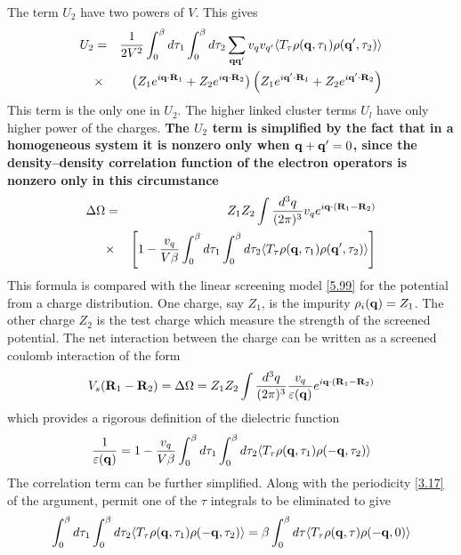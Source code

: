 The term $U_2$ have two powers of $V$. This gives
\begin{eqnarray}
    U_2 &=& \frac{1}{2V^2} \int_0^\beta d\tau_1 \int_0^\beta d \tau_2 \sum_{\mathbf{q}\mathbf{q}'} v_q v_{q'} \langle T_\tau \rho(\mathbf{q},\tau_1) \rho(\mathbf{q}',\tau_2) \rangle \nonumber \\
    &\times&\left( Z_1 e^{i\mathbf{q}\cdot\mathbf{R}_1} +Z_2 e^{i\mathbf{q}\cdot\mathbf{R}_2} \right) \left(Z_1 e^{i\mathbf{q}'\cdot\mathbf{R}_1} +Z_2 e^{i\mathbf{q}'\cdot\mathbf{R}_2} \right) \label{5.105}
\end{eqnarray}
This term is the only one in $U_2$.
The higher linked cluster terms $U_l$ have only higher power of the charges.
\textbf{The $U_2$ term is simplified by the fact that in a homogeneous system it is nonzero only when $\mathbf{q}+\mathbf{q}'=0$, since the density--density correlation function of the electron operators is nonzero only in this circumstance}
\begin{eqnarray}
    \Delta \Omega &=& Z_1 Z_2 \int \frac{d^3q}{(2\pi)^3} v_q e^{i\mathbf{q}\cdot(\mathbf{R}_1-\mathbf{R}_2)} \nonumber \\
    &\times& \left[1 - \frac{v_q}{V\beta} \int_0^\beta d \tau_1 \int_0^\beta d\tau_2  \langle T_\tau \rho(\mathbf{q},\tau_1) \rho(\mathbf{q}',\tau_2) \rangle \right] \label{5.107}
\end{eqnarray}
This formula is compared with the linear screening model \eqref{5.99} for the potential from a charge distribution.
One charge, say $Z_1$, is the impurity $\rho_i(\mathbf{q})=Z_1$.
The other charge $Z_2$ is the test charge which measure the strength of the screened potential.
The net interaction between the charge can be written as a screened coulomb interaction of the form
\begin{equation}
    V_s(\mathbf{R}_1 -\mathbf{R}_2) = \Delta \Omega = Z_1 Z_2 \int \frac{d^3q}{(2\pi)^3} \frac{v_q}{\varepsilon(\mathbf{q})} e^{i\mathbf{q}\cdot (\mathbf{R}_1-\mathbf{R}_2)} \label{5.108}
\end{equation}
which provides a rigorous definition of the dielectric function
\begin{equation}
    \frac{1}{\varepsilon(\mathbf{q})} = 1 - \frac{v_q}{V\beta} \int_0^\beta d\tau_1 \int_0^\beta d\tau_2 \langle T_\tau \rho(\mathbf{q},\tau_1)\rho(-\mathbf{q},\tau_2) \rangle   \label{5.109}
\end{equation}
The correlation term can be further simplified.
Along with the periodicity \eqref{3.17} of the argument, permit one of the $\tau$ integrals to be eliminated to give
\begin{equation}
    \int_0^\beta d\tau_1 \int_0^\beta d\tau_2 \langle T_\tau \rho(\mathbf{q},\tau_1)\rho(-\mathbf{q},\tau_2) \rangle  = \beta \int_0^\beta d\tau \langle T_\tau \rho(\mathbf{q},\tau) \rho(-\mathbf{q},0)\rangle
\end{equation}

